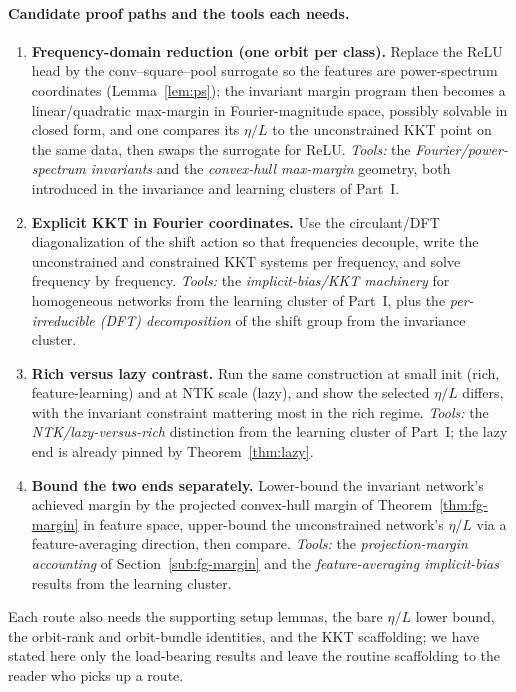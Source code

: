 \paragraph{Candidate proof paths and the tools each needs.}
\begin{enumerate}[leftmargin=1.6em]
\item \textbf{Frequency-domain reduction (one orbit per class).} Replace the ReLU head by the
conv--square--pool surrogate so the features are power-spectrum coordinates (Lemma~\ref{lem:ps}); the
invariant margin program then becomes a linear/quadratic max-margin in Fourier-magnitude space,
possibly solvable in closed form, and one compares its $\eta/L$ to the unconstrained KKT point on the
same data, then swaps the surrogate for ReLU.
\emph{Tools:} the \emph{Fourier/power-spectrum invariants} and the \emph{convex-hull max-margin}
geometry, both introduced in the invariance and learning clusters of Part~I.
\item \textbf{Explicit KKT in Fourier coordinates.} Use the circulant/DFT diagonalization of the shift
action so that frequencies decouple, write the unconstrained and constrained KKT systems per
frequency, and solve frequency by frequency.
\emph{Tools:} the \emph{implicit-bias/KKT machinery} for homogeneous networks
\citep{lyuli2020,jitelgarsky2019,soudry2018} from the learning cluster of Part~I, plus the
\emph{per-irreducible (DFT) decomposition} of the shift group from the invariance cluster.
\item \textbf{Rich versus lazy contrast.} Run the same construction at small init (rich,
feature-learning) and at NTK scale (lazy), and show the selected $\eta/L$ differs, with the invariant
constraint mattering most in the rich regime.
\emph{Tools:} the \emph{NTK/lazy-versus-rich} distinction from the learning cluster of Part~I; the
lazy end is already pinned by Theorem~\ref{thm:lazy}.
\item \textbf{Bound the two ends separately.} Lower-bound the invariant network's achieved margin by
the projected convex-hull margin of Theorem~\ref{thm:fg-margin} in feature space, upper-bound the
unconstrained network's $\eta/L$ via a feature-averaging direction, then compare.
\emph{Tools:} the \emph{projection-margin accounting} of Section~\ref{sub:fg-margin} and the
\emph{feature-averaging implicit-bias} results \citep{li2025feature} from the learning cluster.
\end{enumerate}
Each route also needs the supporting setup lemmas, the bare $\eta/L$ lower bound, the orbit-rank and
orbit-bundle identities, and the KKT scaffolding; we have stated here only the load-bearing results
and leave the routine scaffolding to the reader who picks up a route.


